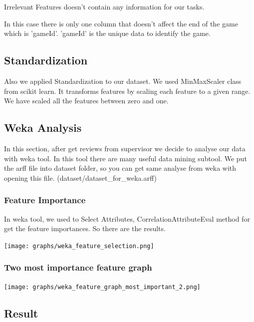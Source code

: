 \documentclass[a4paper]{article}
\begin{document}
Irrelevant Features doesn't contain any information for our tasks.

\medskip

In this case there is only one column that doesn't affect the end of the game which is 'gameId'. 'gameId' is the unique data to identify the game.


\bigskip 

\subsection{Standardization}
Also we applied Standardization to our dataset. We used MinMaxScaler class from scikit learn. It transforms features by scaling each feature to a given range. We have scaled all the features between zero and one.


\pagebreak


\subsection{Weka Analysis}

In this section, after get reviews from supervisor we decide to analyse our data with weka tool. In this tool there are many useful data mining subtool. We put the arff file into dataset folder, so you can get same analyse from weka with opening this file. (dataset/dataset\_for\_weka.arff)


\subsubsection{Feature Importance}

In weka tool, we used to Select Attributes, CorrelationAttributeEval method for get the feature importances. So there are the results.
\medskip

\texttt{[image: graphs/weka\_feature\_selection.png]}

\subsubsection{Two most importance feature graph}

\texttt{[image: graphs/weka\_feature\_graph\_most\_important\_2.png]}

\medskip

\subsection{Result}
\end{document}
